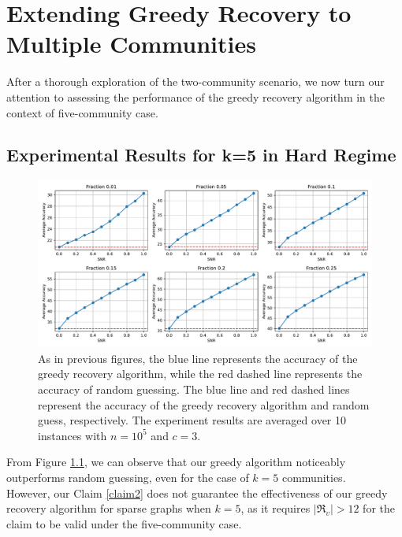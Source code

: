 \chapter{Extending Greedy Recovery to Multiple Communities} \label{chapter 5}
After a thorough exploration of the two-community scenario, we now turn our attention to assessing the performance of the greedy recovery algorithm in the context of five-community case.
\section{Experimental Results for k=5 in Hard Regime}
\begin{figure}[ht]
    \centering
    \includegraphics[width=1\linewidth]{Figures/multi_groups_sparse(modified)_1.pdf}
    \caption[Accuracy of Greedy Recovery Algorithm in Sparse Graph with $k=5$]{As in previous figures, the blue line represents the accuracy of the greedy recovery algorithm, while the red dashed line represents the accuracy of random guessing. The blue line and red dashed lines represent the accuracy of the greedy recovery algorithm and random guess, respectively. The experiment results are averaged over 10 instances with $n=10^5$ and $c=3.$}
    \label{fig: multi_groups}
\end{figure}
From Figure \ref{fig: multi_groups}, we can observe that our greedy algorithm noticeably outperforms random guessing, even for the case of $k=5$ communities.\\
However, our Claim \ref{claim2} does not guarantee the effectiveness of our greedy recovery algorithm for sparse graphs when $k=5$, as it requires $|\Re_v| > 12$ for the claim to be valid under the five-community case.